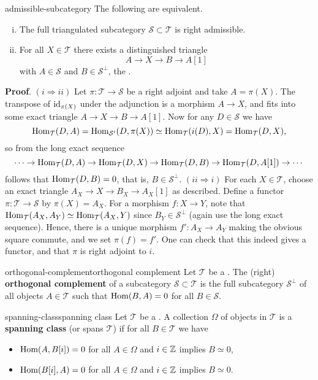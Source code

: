 \begin{example}{admissible-subcategory}
    The following are equivalent.
    \begin{enumerate}[(i)]
        \item The full triangulated subcategory $\mathcal{S} \subset \mathcal{T}$ is right admissible.
        \item For all $X \in \mathcal{T}$ there exists a distinguished triangle
        \[ A \to X \to B \to A[1] \]
        with $A \in \mathcal{S}$ and $B \in {\mathcal{S}}^\perp$, the .
    \end{enumerate}
    \textbf{Proof}. $(i \Rightarrow ii)$ Let $\pi : \mathcal{T} \to \mathcal{S}$ be a right adjoint and take $A = \pi(X)$. The transpose of $\text{id}_{\pi(X)}$ under the adjunction is a morphism $A \to X$, and fits into some exact triangle $A \to X \to B \to A[1]$. Now for any $D \in \mathcal{S}$ we have
    \[ \text{Hom}_\mathcal{T}(D, A) = \text{Hom}_{\mathcal{S}'}(D, \pi(X)) \simeq \text{Hom}_\mathcal{T}(i(D), X) = \text{Hom}_\mathcal{T}(D, X) , \]
    so from the long exact sequence
    \[ \cdots \to \text{Hom}_\mathcal{T}(D, A) \to \text{Hom}_\mathcal{T}(D, X) \to \text{Hom}_\mathcal{T}(D, B) \to \text{Hom}_\mathcal{T}(D, A[1]) \to \cdots \]
    follows that $\text{Hom}_\mathcal{T}(D, B) = 0$, that is, $B \in \mathcal{S}^\perp$.
    $(ii \Rightarrow i)$ For each $X \in \mathcal{T}$, choose an exact triangle $A_X \to X \to B_X \to A_X[1]$ as described. Define a functor $\pi : \mathcal{T} \to \mathcal{S}$ by $\pi(X) = A_X$. For a morphism $f : X \to Y$, note that $\text{Hom}_\mathcal{T}(A_X, A_Y) \simeq \text{Hom}_\mathcal{T}(A_X, Y)$ since $B_Y \in \mathcal{S}^\perp$ (again use the long exact sequence). Hence, there is a unique morphism $f' : A_X \to A_Y$ making the obvious square commute, and we set $\pi(f) = f'$. One can check that this indeed gives a functor, and that $\pi$ is right adjoint to $i$.
\end{example}

\begin{topic}{orthogonal-complement}{orthogonal complement}
    Let $\mathcal{T}$ be a . The (right) \textbf{orthogonal complement} of a subcategory $\mathcal{S} \subset \mathcal{T}$ is the full subcategory $\mathcal{S}^\perp$ of all objects $A \in \mathcal{T}$ such that $\text{Hom}(B, A) = 0$ for all $B \in \mathcal{S}$.
\end{topic}

\begin{topic}{spanning-class}{spanning class}
    Let $\mathcal{T}$ be a . A collection $\Omega$ of objects in $\mathcal{T}$ is a \textbf{spanning class} (or spans $\mathcal{T}$) if for all $B \in \mathcal{T}$ we have
    \begin{itemize}
        \item $\text{Hom}(A, B[i]) = 0$ for all $A \in \Omega$ and $i \in \mathbb{Z}$ implies $B \simeq 0$,
        \item $\text{Hom}(B[i], A) = 0$ for all $A \in \Omega$ and $i \in \mathbb{Z}$ implies $B \simeq 0$.
    \end{itemize}
\end{topic}

